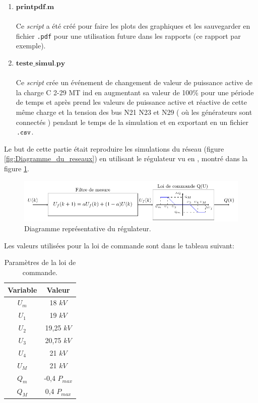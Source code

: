 \begin{enumerate}[\bfseries 4.3.1]
	\\
	\item $\mathbf{printpdf.m}$\\
	\\Ce \textit{script} a été créé pour faire les plots des graphiques et les sauvegarder en fichier \verb|.pdf| pour une utilisation future dans les rapports (ce rapport par exemple). 
	\\\pagebreak
	\item $\mathbf{teste\_simul.py}$\\
	\\Ce \textit{script} crée un événement de changement de valeur de puissance active de la charge C 2-29 MT ind en augmentant sa valeur de 100\% pour une période de temps et après prend les valeurs de puissance active et réactive de cette même charge et la tension des bus N21 N23 et N29 ( où les générateurs sont connectés ) pendant le temps de la simulation et en exportant en un fichier $ \verb|.csv| $.
	\\ 
\end{enumerate}

Le but de cette partie était reproduire les simulations du réseau (figure \ref{fig:Diagramme_du_reseaux}) en utilisant le régulateur vu en \cite{cosson:tel-01374469}, montré dans la figure \ref{fig:regulateur}.

\begin{figure}[H]
	\centering
	\includegraphics[]{Figuras/Methodologie/partie_4/regulateur}
	\caption{Diagramme représentative du régulateur.}
	\label{fig:regulateur}
\end{figure}

Les valeurs utilisées pour la loi de commande sont dans le tableau suivant:
\begin{table}[H]
	\captionsetup{justification=centering,margin=0cm}
\caption{Paramètres de la loi de commande.}
\centering
\label{tab:valeurs_loicommande}
\begin{tabular}{|c|c|}
	\hline
Variable&Valeur\\
	\hline
$ U_m $&18 $kV$\\
	\hline
$ U_1 $&19 $kV$\\
	\hline
$ U_2 $&19,25 $kV$\\
	\hline
$ U_3 $&20,75 $kV$\\
	\hline
$ U_4 $&21 $kV$\\
	\hline
$ U_M $&21 $kV$\\
	\hline
$ Q_m $&-0,4 $ P_{max} $\\
	\hline
$ Q_M $&0,4 $ P_{max} $\\
	\hline
\end{tabular}
\end{table}


